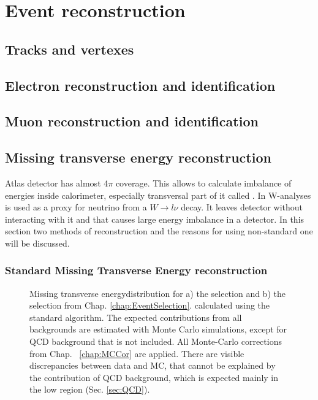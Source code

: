 \chapter{Event reconstruction}
\section{Tracks and vertexes}
\section{Electron reconstruction and identification}
\section{Muon reconstruction and identification}
\section{Missing transverse energy reconstruction}
Atlas detector has almost 4$\pi$ coverage. This allows to calculate imbalance of energies inside calorimeter, especially transversal part of it called \etmiss.  In W-analyses \etmiss is used as a proxy for neutrino from a $W \to l\nu$ decay. It leaves detector without interacting with it and that causes large energy imbalance in a detector. In this section two methods of \etmiss reconstruction and the reasons for using non-standard one will be discussed.

\subsection{Standard Missing Transverse Energy reconstruction}

\begin{figure}[!tbp]
\begin{minipage}[h]{0.49\linewidth}
\end{minipage}
\hfill
\begin{minipage}[h]{0.49\linewidth}
\end{minipage}
\caption{Missing transverse energydistribution for a) the \wenu selection and  b) the \wmunu selection from Chap. \ref{chap:EventSelection}. \etmiss  calculated using the standard \atlas algorithm. The expected contributions from all backgrounds are estimated with Monte Carlo simulations, except for QCD background that is not included. All Monte-Carlo corrections from Chap. ~\ref{chap:MCCor} are applied. There are visible discrepancies between data and MC, that cannot be explained by the contribution of QCD background, which is expected mainly in the low \etmiss region (Sec. \ref{sec:QCD}).}
\label{ris:EtMissRefFinal}
\end{figure}

